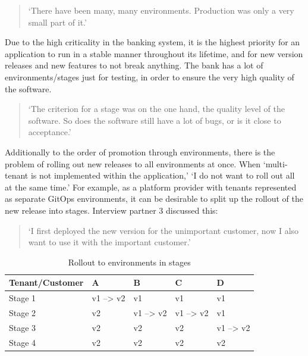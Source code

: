 \begin{quotation}
	\noindent
	\enquote*{There have been many, many environments. Production was only a very small part of it.}
\end{quotation}

Due to the high criticality in the banking system,
it is the highest priority for an application to run in a stable manner throughout its lifetime,
and for new version releases and new features to not break anything.
The bank has a lot of environments/stages just for testing, in order to ensure the
very high quality of the software.

\begin{quotation}
	\noindent
	\enquote*{The criterion for a stage was on the one hand, the quality level of the software. So does the software still have a lot of bugs, or is it close to acceptance.}
\end{quotation}

Additionally to the order of promotion through environments,
there is the problem of rolling out new releases to all environments at once.
When
\enquote*{multi-tenant is not implemented within the application,}
\enquote*{I do not want to roll out all at the same time.}
For example, as a platform provider with tenants represented as separate GitOps
environments, it can be desirable to split up the rollout of the new release into
stages. Interview partner 3 discussed this:

\begin{quotation}
	\noindent
	\enquote*{I first deployed the new version for the unimportant customer, now I also want to use it with the important customer.}
\end{quotation}

\begin{table}[h]
\begin{center}
\begin{tabular}{ |p{2.8cm}||p{1.5cm}|p{1.5cm}|p{1.5cm}|p{1.5cm}|  }
	\hline
	Tenant/Customer & A & B & C & D\\
	\hline
	Stage 1   & v1 --> v2    &v1&   v1 & v1\\
	Stage 2 &   v2  & v1 --> v2   & v1 --> v2 & v1\\
	Stage 3 &v2 & v2&  v2 & v1 --> v2 \\
	Stage 4 &v2 & v2&  v2 & v2\\
	\hline
\end{tabular}
\caption{Rollout to environments in stages}
\label{table:rollout-envs-stages}
\end{center}
\end{table}

